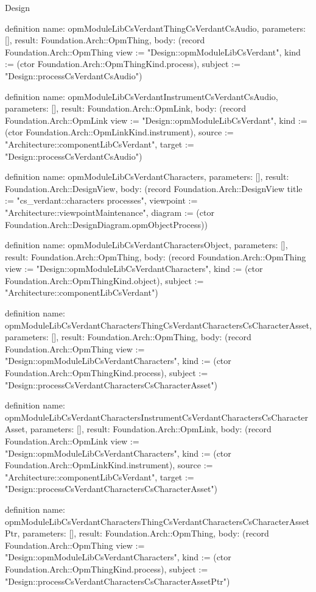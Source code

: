 \begin{lexlean}{Design}
\begin{semanticmodule}
definition{
  name: opmModuleLibCsVerdantThingCsVerdantCsAudio,
  parameters: [],
  result: Foundation.Arch::OpmThing,
  body: (record Foundation.Arch::OpmThing {view := "Design::opmModuleLibCsVerdant", kind := (ctor Foundation.Arch::OpmThingKind.process), subject := "Design::processCsVerdantCsAudio"})
}

definition{
  name: opmModuleLibCsVerdantInstrumentCsVerdantCsAudio,
  parameters: [],
  result: Foundation.Arch::OpmLink,
  body: (record Foundation.Arch::OpmLink {view := "Design::opmModuleLibCsVerdant", kind := (ctor Foundation.Arch::OpmLinkKind.instrument), source := "Architecture::componentLibCsVerdant", target := "Design::processCsVerdantCsAudio"})
}

definition{
  name: opmModuleLibCsVerdantCharacters,
  parameters: [],
  result: Foundation.Arch::DesignView,
  body: (record Foundation.Arch::DesignView {title := "cs_verdant::characters processes", viewpoint := "Architecture::viewpointMaintenance", diagram := (ctor Foundation.Arch::DesignDiagram.opmObjectProcess)})
}

definition{
  name: opmModuleLibCsVerdantCharactersObject,
  parameters: [],
  result: Foundation.Arch::OpmThing,
  body: (record Foundation.Arch::OpmThing {view := "Design::opmModuleLibCsVerdantCharacters", kind := (ctor Foundation.Arch::OpmThingKind.object), subject := "Architecture::componentLibCsVerdant"})
}

definition{
  name: opmModuleLibCsVerdantCharactersThingCsVerdantCharactersCsCharacterAsset,
  parameters: [],
  result: Foundation.Arch::OpmThing,
  body: (record Foundation.Arch::OpmThing {view := "Design::opmModuleLibCsVerdantCharacters", kind := (ctor Foundation.Arch::OpmThingKind.process), subject := "Design::processCsVerdantCharactersCsCharacterAsset"})
}

definition{
  name: opmModuleLibCsVerdantCharactersInstrumentCsVerdantCharactersCsCharacterAsset,
  parameters: [],
  result: Foundation.Arch::OpmLink,
  body: (record Foundation.Arch::OpmLink {view := "Design::opmModuleLibCsVerdantCharacters", kind := (ctor Foundation.Arch::OpmLinkKind.instrument), source := "Architecture::componentLibCsVerdant", target := "Design::processCsVerdantCharactersCsCharacterAsset"})
}

definition{
  name: opmModuleLibCsVerdantCharactersThingCsVerdantCharactersCsCharacterAssetPtr,
  parameters: [],
  result: Foundation.Arch::OpmThing,
  body: (record Foundation.Arch::OpmThing {view := "Design::opmModuleLibCsVerdantCharacters", kind := (ctor Foundation.Arch::OpmThingKind.process), subject := "Design::processCsVerdantCharactersCsCharacterAssetPtr"})
}


\end{semanticmodule}
\end{lexlean}
